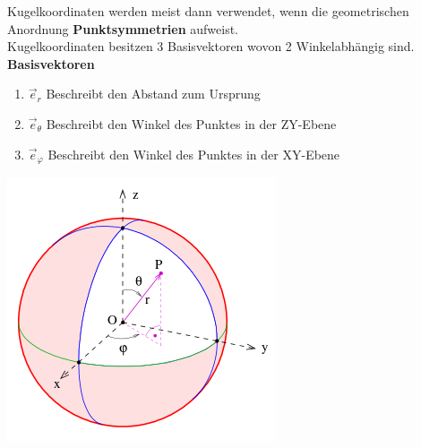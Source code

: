 {}
\beginip
Kugelkoordinaten werden meist dann verwendet, wenn die geometrischen Anordnung \textbf{Punktsymmetrien} aufweist. \\
Kugelkoordinaten besitzen 3 Basisvektoren wovon 2 Winkelabhängig sind. \\
\textbf{Basisvektoren}
\begin{enumerate}
	\item $\vec{e}_r$ Beschreibt den Abstand zum Ursprung
	\item $\vec{e}_\theta$ Beschreibt den Winkel des Punktes in der ZY-Ebene
	\item $\vec{e}_\varphi$ Beschreibt den Winkel des Punktes in der XY-Ebene
\end{enumerate}
\begin{center}
	\includegraphics[scale = 0.5	]{kugelkoord.png}
\end{center}


\iend
\newpage
{}


\beginip


